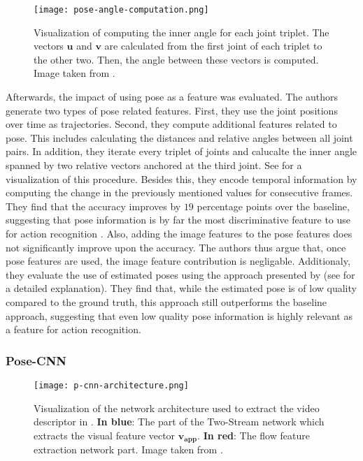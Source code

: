 \begin{figure}[htb!]
    \centering
    \texttt{[image: pose-angle-computation.png]}
    \caption{Visualization of computing the inner angle for each joint triplet. The vectors $\bm{u}$ and $\bm{v}$ are calculated from the first joint of each triplet to the other two. Then, the angle between these vectors is computed. Image taken from \cite{jhuang_towards_2013}. }
    \label{fig:joint-angle-computation}
\end{figure}

Afterwards, the impact of using pose as a feature was evaluated.
The authors generate two types of pose related features. 
First, they use the joint positions over time as trajectories. 
Second, they compute additional features related to pose.
This includes calculating the distances and relative angles between all joint pairs. 
In addition, they iterate every triplet of joints and calucalte the inner angle spanned by two relative vectors anchored at the third joint.
See  for a visualization of this procedure.
Besides this, they encode temporal information by computing the change in the previously mentioned values for consecutive frames.
They find that the accuracy improves by $19$ percentage points over the baseline, suggesting that pose information is by far the most discriminative feature to use for action recognition \cite{jhuang_towards_2013}. 
Also, adding the image features to the pose features does not significantly improve upon the accuracy. 
The authors thus argue that, once pose features are used, the image feature contribution is negligable.
Additionaly, they evaluate the use of estimated poses using the approach presented by \cite{yang_articulated_2011} (see  for a detailed explanation). 
They find that, while the estimated pose is of low quality compared to the ground truth, this approach still outperforms the baseline approach, suggesting that even low quality pose information is highly relevant as a feature for action recognition.

\subsubsection{Pose-CNN}

\begin{figure}[htb!]
    \centering
    \texttt{[image: p-cnn-architecture.png]}
    \caption{Visualization of the network architecture used to extract the video descriptor in \cite{cheron_pcnn_2015}. \textbf{In blue}: The part of the Two-Stream network which extracts the visual feature vector $\bm{v_{app}}$. \textbf{In red}: The flow feature extraction network part. Image taken from \cite{cheron_pcnn_2015}. }
    \label{fig:p-cnn-architecture}
\end{figure}

